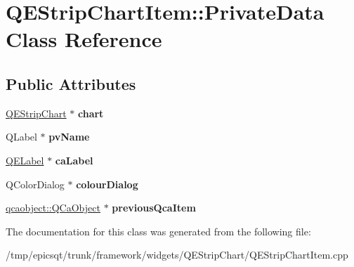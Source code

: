 \hypertarget{classQEStripChartItem_1_1PrivateData}{
\section{QEStripChartItem::PrivateData Class Reference}
\label{classQEStripChartItem_1_1PrivateData}
}
\subsection*{Public Attributes}
\begin{DoxyCompactItemize}
\item 
\hypertarget{classQEStripChartItem_1_1PrivateData_af1ca86e672925858072b33786f862278}{
\hyperlink{classQEStripChart}{QEStripChart} $\ast$ {\bfseries chart}}
\label{classQEStripChartItem_1_1PrivateData_af1ca86e672925858072b33786f862278}

\item 
\hypertarget{classQEStripChartItem_1_1PrivateData_aee7200cc9e19206f7b085751ba3a558c}{
QLabel $\ast$ {\bfseries pvName}}
\label{classQEStripChartItem_1_1PrivateData_aee7200cc9e19206f7b085751ba3a558c}

\item 
\hypertarget{classQEStripChartItem_1_1PrivateData_a142634b61b2d8193ddb812986cc89ec4}{
\hyperlink{classQELabel}{QELabel} $\ast$ {\bfseries caLabel}}
\label{classQEStripChartItem_1_1PrivateData_a142634b61b2d8193ddb812986cc89ec4}

\item 
\hypertarget{classQEStripChartItem_1_1PrivateData_ab8d23b19f2378cc3c8569142bdac7085}{
QColorDialog $\ast$ {\bfseries colourDialog}}
\label{classQEStripChartItem_1_1PrivateData_ab8d23b19f2378cc3c8569142bdac7085}

\item 
\hypertarget{classQEStripChartItem_1_1PrivateData_a47930f7af1e12bd8859937551cf9e3eb}{
\hyperlink{classqcaobject_1_1QCaObject}{qcaobject::QCaObject} $\ast$ {\bfseries previousQcaItem}}
\label{classQEStripChartItem_1_1PrivateData_a47930f7af1e12bd8859937551cf9e3eb}

\end{DoxyCompactItemize}


The documentation for this class was generated from the following file:\begin{DoxyCompactItemize}
\item 
/tmp/epicsqt/trunk/framework/widgets/QEStripChart/QEStripChartItem.cpp\end{DoxyCompactItemize}
